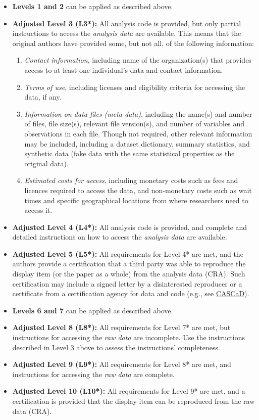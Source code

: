 \documentclass[
]{book}
\providecommand{\tightlist}{%
  \setlength{\itemsep}{0pt}\setlength{\parskip}{0pt}}
\begin{document}
\begin{itemize}
\item
  \textbf{Levels 1 and 2} can be applied as described above.
\item
  \textbf{Adjusted Level 3 (L3*):} All analysis code is provided, but only partial instructions to access the \emph{analysis data} are available. This means that the original authors have provided some, but not all, of the following information:

  \begin{enumerate}
  \def\labelenumi{\alph{enumi}.}
  \tightlist
  \item
    \emph{Contact information}, including name of the organization(s) that provides access to at least one individual's data and contact information.
  \item
    \emph{Terms of use}, including licenses and eligibility criteria for accessing the data, if any.
  \item
    \emph{Information on data files (meta-data)}, including the name(s) and number of files, file size(s), relevant file version(s), and number of variables and observations in each file. Though not required, other relevant information may be included, including a dataset dictionary, summary statistics, and synthetic data (fake data with the same statistical properties as the original data).
  \item
    \emph{Estimated costs for access}, including monetary costs such as fees and licences required to access the data, and non-monetary costs such as wait times and specific geographical locations from where researchers need to access it.
  \end{enumerate}
\item
  \textbf{Adjusted Level 4 (L4*):} All analysis code is provided, and complete and detailed instructions on how to access the \emph{analysis data} are available.
\item
  \textbf{Adjusted Level 5 (L5*):} All requirements for Level 4* are met, and the authors provide a certification that a third party was able to reproduce the display item (or the paper as a whole) from the analysis data (CRA). Such certification may include a signed letter by a disinterested reproducer or a certificate from a certification agency for data and code (e.g., see \href{https://www.cascad.tech/}{CASCaD}).
\item
  \textbf{Levels 6 and 7} can be applied as described above.
\item
  \textbf{Adjusted Level 8 (L8*):} All requirements for Level 7* are met, but instructions for accessing the \emph{raw data} are incomplete. Use the instructions described in Level 3 above to assess the instructions' completeness.
\item
  \textbf{Adjusted Level 9 (L9*):} All requirements for Level 8* are met, and instructions for accessing the \emph{raw data} are complete.
\item
  \textbf{Adjusted Level 10 (L10*):} All requirements for Level 9* are met, and a certification is provided that the display item can be reproduced from the raw data (CRA).
\end{itemize}
\end{document}
